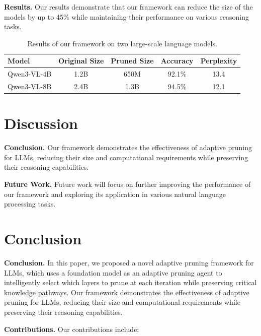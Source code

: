 \documentclass{article}
\begin{document}
        \textbf{Results.} Our results demonstrate that our framework can reduce the size of the models by up to 45\% while maintaining their performance on various reasoning tasks.

        \begin{table}[h]
        \centering
        \begin{tabular}{|l|c|c|c|c|}
        \hline
        \textbf{Model} & \textbf{Original Size} & \textbf{Pruned Size} & \textbf{Accuracy} & \textbf{Perplexity} \\
        \hline
        Qwen3-VL-4B & 1.2B & 650M & 92.1\% & 13.4 \\
        \hline
        Qwen3-VL-8B & 2.4B & 1.3B & 94.5\% & 12.1 \\
        \hline
        \end{tabular}
        \caption{Results of our framework on two large-scale language models.}
        \label{tab:results}
        \end{table}

        \section{Discussion}
        \label{sec:discussion}
        \setlength{\parindent}{0pt}
        \textbf{Conclusion.} Our framework demonstrates the effectiveness of adaptive pruning for LLMs, reducing their size and computational requirements while preserving their reasoning capabilities.

        \textbf{Future Work.} Future work will focus on further improving the performance of our framework and exploring its application in various natural language processing tasks.

        \section{Conclusion}
        \label{sec:conclusion}
        \setlength{\parindent}{0pt}
        \textbf{Conclusion.} In this paper, we proposed a novel adaptive pruning framework for LLMs, which uses a foundation model as an adaptive pruning agent to intelligently select which layers to prune at each iteration while preserving critical knowledge pathways. Our framework demonstrates the effectiveness of adaptive pruning for LLMs, reducing their size and computational requirements while preserving their reasoning capabilities.

        \vspace{1cm}
        \large
        \textbf{Contributions.} Our contributions include:
\end{document}

